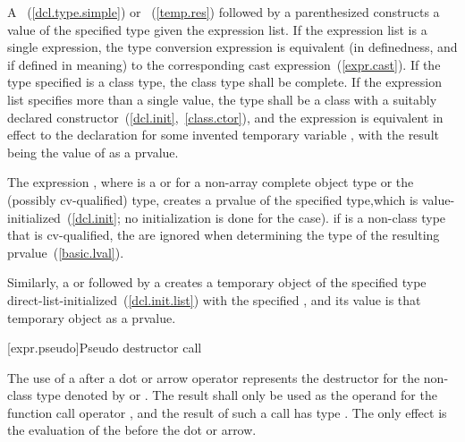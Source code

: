 \pnum
{}
%
%
%
%
A ~(\ref{dcl.type.simple}) or
~(\ref{temp.res}) followed by a
parenthesized  constructs a value of the
specified type given the expression list. If the expression list is a
single expression, the type conversion expression is equivalent (in
definedness, and if defined in meaning) to the corresponding cast
expression~(\ref{expr.cast}).
%
If the type specified is a class type, the
class type shall be complete. If the expression list specifies more than
a single value, the type shall be a class with a suitably declared
constructor~(\ref{dcl.init},~\ref{class.ctor}), and the expression
 is equivalent in effect to the declaration
 for some invented temporary variable
, with the result being the value of  as a prvalue.

\pnum
The expression , where  is a
 or  for a non-array complete object
type or the (possibly cv-qualified)  type, creates a prvalue of the
specified type,which is value-initialized~(\ref{dcl.init}; no
initialization is done for the  case).
\enternote 
if  is a non-class type that is cv-qualified, the
 are ignored when determining the type of the
resulting prvalue~(\ref{basic.lval}).
\exitnote 

\pnum
Similarly, a  or
 followed by a 
creates a temporary object of the specified type
direct-list-initialized~(\ref{dcl.init.list}) with the specified
, and its value is that temporary object as a
prvalue.

[expr.pseudo]{Pseudo destructor call}

\pnum
{}
%
%
The use of a  after a dot  or
arrow \tcode{->} operator represents the destructor for the non-class
type denoted by  or .
The result shall only be used as the
operand for the function call operator \tcode{()}, and the result of
such a call has type . The only effect is the evaluation of
the  before the dot or arrow.

